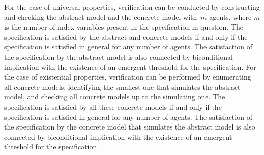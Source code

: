 For the case of universal properties,
verification can be conducted by constructing and checking the abstract model
and the concrete model with~$m$ agents, where $m$ is the number of index
variables present in the specification in question. The specification is satisfied by
the abstract and concrete models if and only if the specification is satisfied in general
for any number of agents.  The satisfaction of the specification by the abstract
model is also connected by biconditional implication with the existence of an
emergent threshold for the specification.
For the case of  existential properties,
verification can be performed by enumerating all concrete models, identifying
the smallest one that simulates the abstract model, and checking all concrete
models up to the simulating one.  The specification is satisfied by all these
concrete models if and only if the specification is satisfied in general for any number of
agents.   The satisfaction of the specification by the concrete model that
simulates the abstract model is also connected by biconditional implication with
the existence of an emergent threshold for the specification. 









